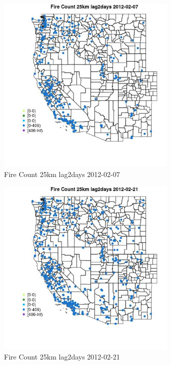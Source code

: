 \begin{figure} 
\centering  
\includegraphics[width=0.77\textwidth]{Code_Outputs/Report_ML_input_PM25_Step4_part_f_de_duplicated_aveswNAs_MapObsFire_Count_25km_lag2days2012-02-07.jpg} 
\caption{\label{fig:Report_ML_input_PM25_Step4_part_f_de_duplicated_aveswNAsMapObsFire_Count_25km_lag2days2012-02-07}Fire Count 25km lag2days 2012-02-07} 
\end{figure} 
 

\begin{figure} 
\centering  
\includegraphics[width=0.77\textwidth]{Code_Outputs/Report_ML_input_PM25_Step4_part_f_de_duplicated_aveswNAs_MapObsFire_Count_25km_lag2days2012-02-21.jpg} 
\caption{\label{fig:Report_ML_input_PM25_Step4_part_f_de_duplicated_aveswNAsMapObsFire_Count_25km_lag2days2012-02-21}Fire Count 25km lag2days 2012-02-21} 
\end{figure} 
 

